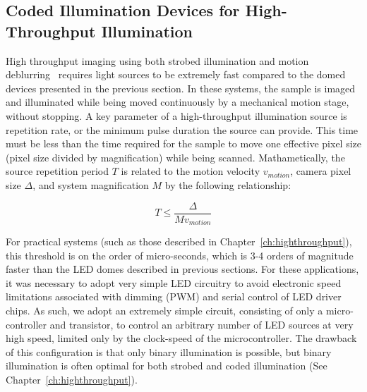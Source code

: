 \subsection{Coded Illumination Devices for High-Throughput Illumination}\label{sec:fabrication:highthroughput}

High throughput imaging using both strobed illumination and motion deblurring~\cite{raskar2006coded} requires light sources to be extremely fast compared to the domed devices presented in the previous section. In these systems, the sample is imaged and illuminated while being moved continuously by a mechanical motion stage, without stopping. A key parameter of a high-throughput illumination source is repetition rate, or the minimum pulse duration the source can provide. This time must be less than the time required for the sample to move one effective pixel size (pixel size divided by magnification) while being scanned. Mathametically, the source repetition period $T$ is related to the motion velocity $v_{motion}$, camera pixel size $\Delta$, and system magnification $M$ by the following relationship:

\begin{equation}
    T \leq \frac{\Delta}{Mv_{motion}}
\end{equation}

For practical systems (such as those described in Chapter~\ref{ch:highthroughput}), this threshold is on the order of micro-seconds, which is 3-4 orders of magnitude faster than the LED domes described in previous sections. For these applications, it was necessary to adopt very simple LED circuitry to avoid electronic speed limitations associated with dimming (PWM) and serial control of LED driver chips. As such, we adopt an extremely simple circuit, consisting of only a micro-controller and transistor, to control an arbitrary number of LED sources at very high speed, limited only by the clock-speed of the microcontroller. The drawback of this configuration is that only binary illumination is possible, but binary illumination is often optimal for both strobed and coded illumination (See Chapter~\ref{ch:highthroughput}).

